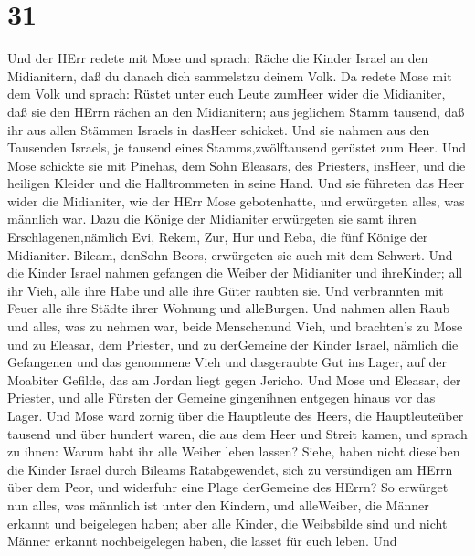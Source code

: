 \hypertarget{section-30}{%
\section{31}\label{section-30}}

 Und der HErr redete mit Mose und sprach:  Räche
die Kinder Israel an den Midianitern, daß du danach dich sammelstzu
deinem Volk.  Da redete Mose mit dem Volk und sprach: Rüstet
unter euch Leute zumHeer wider die Midianiter, daß sie den HErrn rächen
an den Midianitern;  aus jeglichem Stamm tausend, daß ihr
aus allen Stämmen Israels in dasHeer schicket.  Und sie
nahmen aus den Tausenden Israels, je tausend eines Stamms,zwölftausend
gerüstet zum Heer.  Und Mose schickte sie mit Pinehas, dem
Sohn Eleasars, des Priesters, insHeer, und die heiligen Kleider und die
Halltrommeten in seine Hand.  Und sie führeten das Heer
wider die Midianiter, wie der HErr Mose gebotenhatte, und erwürgeten
alles, was männlich war.  Dazu die Könige der Midianiter
erwürgeten sie samt ihren Erschlagenen,nämlich Evi, Rekem, Zur, Hur und
Reba, die fünf Könige der Midianiter. Bileam, denSohn Beors, erwürgeten
sie auch mit dem Schwert.  Und die Kinder Israel nahmen
gefangen die Weiber der Midianiter und ihreKinder; all ihr Vieh, alle
ihre Habe und alle ihre Güter raubten sie.  Und verbrannten
mit Feuer alle ihre Städte ihrer Wohnung und alleBurgen. 
Und nahmen allen Raub und alles, was zu nehmen war, beide Menschenund
Vieh,  und brachten's zu Mose und zu Eleasar, dem Priester,
und zu derGemeine der Kinder Israel, nämlich die Gefangenen und das
genommene Vieh und dasgeraubte Gut ins Lager, auf der Moabiter Gefilde,
das am Jordan liegt gegen Jericho.  Und Mose und Eleasar,
der Priester, und alle Fürsten der Gemeine gingenihnen entgegen hinaus
vor das Lager.  Und Mose ward zornig über die Hauptleute
des Heers, die Hauptleuteüber tausend und über hundert waren, die aus
dem Heer und Streit kamen,  und sprach zu ihnen: Warum habt
ihr alle Weiber leben lassen?  Siehe, haben nicht dieselben
die Kinder Israel durch Bileams Ratabgewendet, sich zu versündigen am
HErrn über dem Peor, und widerfuhr eine Plage derGemeine des HErrn?
 So erwürget nun alles, was männlich ist unter den Kindern,
und alleWeiber, die Männer erkannt und beigelegen haben; 
aber alle Kinder, die Weibsbilde sind und nicht Männer erkannt
nochbeigelegen haben, die lasset für euch leben.  Und
